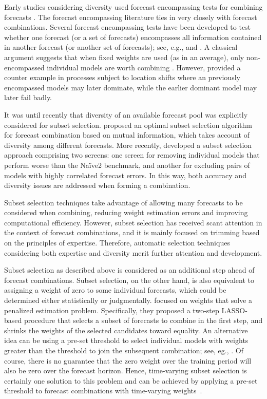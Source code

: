 \documentclass[a4paper,11pt]{article}
\begin{document}
Early studies considering diversity used forecast encompassing tests for combining forecasts \citep[e.g.,][]{Kicsinbay2010-et,Costantini2010-hp}. The forecast encompassing literature ties in very closely with forecast combinations. Several forecast encompassing tests have been developed to test whether one forecast (or a set of forecasts) encompasses all information contained in another forecast (or another set of forecasts); see, e.g., \citet{Chong1986-ec} and \citet{Harvey1998-fe}. A classical argument suggests that when fixed weights are used (as in an average), only non-encompassed individual models are worth combining \citep{Diebold1989-fe}. However, \citet{Hendry2004-pf} provided a counter example in processes subject to location shifts where an previously encompassed models may later dominate, while the earlier dominant model may later fail badly.

It was until recently that diversity of an available forecast pool was explicitly considered for subset selection. \citet{Cang2014-tp} proposed an optimal subset selection algorithm for forecast combination based on mutual information, which takes account of diversity among different forecasts. More recently, \citet{Lichtendahl2020-ut} developed a subset selection approach comprising two screens: one screen for removing individual models that perform worse than the Na\"{i}ve2 benchmark, and another for excluding pairs of models with highly correlated forecast errors. In this way, both accuracy and diversity issues are addressed when forming a combination.

Subset selection techniques take advantage of allowing many forecasts to be considered when combining, reducing weight estimation errors and improving computational efficiency. However, subset selection has received scant attention in the context of forecast combinations, and it is mainly focused on trimming based on the principles of expertise. Therefore, automatic selection techniques considering both expertise and diversity merit further attention and development.

Subset selection as described above is considered as an additional step ahead of forecast combinations. Subset selection, on the other hand, is also equivalent to assigning a weight of zero to some individual forecasts, which could be determined either statistically or judgmentally. \citet{Diebold2019-ml} focused on weights that solve a penalized estimation problem. Specifically, they proposed a two-step LASSO-based procedure that selects a subset of forecasts to combine in the first step, and shrinks the weights of the selected candidates toward equality. An alternative idea can be using a pre-set threshold to select individual models with weights greater than the threshold to join the subsequent combination; see, eg., \citet{Zhou2002-cg,Wang2021-un}. Of course, there is no guarantee that the zero weight over the training period will also be zero over the forecast horizon. Hence, time-varying subset selection is certainly one solution to this problem and can be achieved by applying a pre-set threshold to forecast combinations with time-varying weights~\citep{Li2021-gk}.
\end{document}
